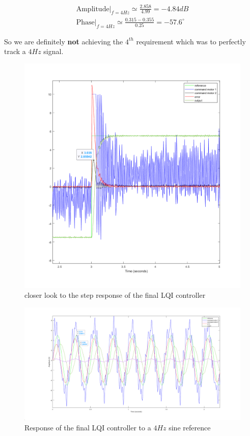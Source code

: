 \begin{gather*}
    \text{Amplitude}\Big|_{f = 4 Hz} \simeq \frac{2.858}{4.99} = -4.84 dB\\
    \text{Phase}\Big|_{f = 4 Hz} \simeq \frac{0.315 - 0.355}{0.25} = -57.6^{\circ}
\end{gather*}

So we are definitely \textbf{not} achieving the $4^{th}$ requirement which was to perfectly track a $4 Hz$ signal.

\begin{figure}[H]
    \centering
    \includegraphics[width = \textwidth]{Pictures/McGiver_zoom.png}
    \caption{closer look to the step response of the final LQI controller}
    \label{fig:lqi zoom}
\end{figure}

\begin{figure}[H]
    \centering
    \includegraphics[width = \textwidth]{Pictures/frequency_response.png}
    \caption{Response of the final LQI controller to a $4 Hz$ sine reference}
    \label{fig:lqi 4Hz}
\end{figure}


